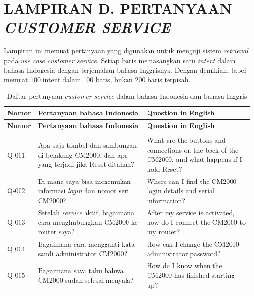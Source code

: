 \clearpage
\chapter*{LAMPIRAN D. PERTANYAAN \emph{CUSTOMER SERVICE}}

Lampiran ini memuat pertanyaan yang digunakan untuk menguji sistem \emph{retrieval} pada
\emph{use case} \emph{customer service}. Setiap baris memasangkan satu \emph{intent} dalam bahasa
Indonesia dengan terjemahan bahasa Inggrisnya. Dengan demikian, tabel memuat 100 intent
dalam 100 baris, bukan 200 baris terpisah.

\begingroup
\small
\setlength{\LTpre}{0pt}
\setlength{\LTpost}{0pt}
\renewcommand{\arraystretch}{1.12}
\begin{longtable}{@{}>{\RaggedRight\arraybackslash}p{1.6cm}>{\RaggedRight\arraybackslash}p{5.8cm}>{\RaggedRight\arraybackslash}p{\dimexpr\textwidth-1.6cm-5.8cm-4\tabcolsep\relax}@{}}
\caption{Daftar pertanyaan \emph{customer service} dalam bahasa Indonesia dan bahasa Inggris}\label{tab:customer-service-question-list}\\
\toprule
\textbf{Nomor} & \textbf{Pertanyaan bahasa Indonesia} & \textbf{Question in English} \\
\midrule
\endfirsthead
\toprule
\textbf{Nomor} & \textbf{Pertanyaan bahasa Indonesia} & \textbf{Question in English} \\
\midrule
\endhead
\midrule
\multicolumn{3}{r@{}}{Bersambung ke halaman berikutnya}\\
\endfoot
\bottomrule
\endlastfoot
Q-001 & Apa saja tombol dan sambungan di belakang CM2000, dan apa yang terjadi jika Reset ditahan? & What are the buttons and connections on the back of the CM2000, and what happens if I hold Reset? \\
Q-002 & Di mana saya bisa menemukan informasi \emph{login} dan nomor seri CM2000? & Where can I find the CM2000 login details and serial information? \\
Q-003 & Setelah \emph{service} aktif, bagaimana cara menghubungkan CM2000 ke router saya? & After my service is activated, how do I connect the CM2000 to my router? \\
Q-004 & Bagaimana cara mengganti kata sandi administrator CM2000? & How can I change the CM2000 administrator password? \\
Q-005 & Bagaimana saya tahu bahwa CM2000 sudah selesai menyala? & How do I know when the CM2000 has finished starting up? \\

\end{longtable}
